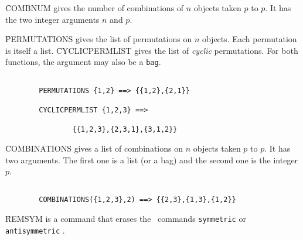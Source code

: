\f{COMBNUM} gives the number of combinations of $n$ objects
taken $p$ to $p$. It has the two integer arguments $n$ and $p$.

\f{PERMUTATIONS} gives the list of permutations on $n$ objects.
Each permutation is itself a list. \f{CYCLICPERMLIST} gives the list of
{\em cyclic} permutations. For both functions, the argument may
also be a {\tt bag}.
\begin{verbatim}

        PERMUTATIONS {1,2} ==> {{1,2},{2,1}}

        CYCLICPERMLIST {1,2,3} ==>

                {{1,2,3},{2,3,1},{3,1,2}}

\end{verbatim}
\f{COMBINATIONS} gives a list of combinations on $n$ objects taken $p$
to $p$. It has two arguments. The first one is a list (or a bag) and
the second one is the integer $p$.
\begin{verbatim}

        COMBINATIONS({1,2,3},2) ==> {{2,3},{1,3},{1,2}}

\end{verbatim}
\f{REMSYM} is a command that erases the \REDUCE\ commands
\verb+symmetric+ or \verb+antisymmetric+ .

